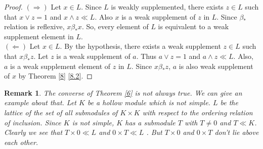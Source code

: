\documentclass[a4paper,12pt]{article}
\newtheorem{remark}[theorem]{Remark}
\numberwithin{equation}{section}
\begin{document}
\begin{proof}
  $ ( \Rightarrow ) $ 
  Let $ x \in L $. Since $ L $ is weakly supplemented, there exists $ z \in L $ such that 
  $ x \vee z = 1 $ and $ x \wedge z \ll L $. Also $ x $ is a weak supplement of $ z $ in $ L $. 
  Since $ \beta_* $ relation is reflexive, $ x \beta_* x $. So, every element of $ L $ is 
  equivalent to a weak supplement element in $ L $. \\
  $ ( \Leftarrow ) $
  Let $ x \in L $. By the hypothesis, there exists a weak supplement $ z \in L $ such that 
  $ x \beta_* z $. Let $ z $ is a weak supplement of $ a $. Thus $ a \vee z = 1 $ and $ a \wedge z \ll L $. 
  Also, $ a $ is a weak supplement element of $ z $ in $ L $. Since $ x \beta_* z $, 
  $ a $ is also weak supplement of $ x $ by Theorem \ref{8} \ref{8.2}.  
\end{proof}
\begin{remark}
  The converse of Theorem \ref{6} is not always true. We can give an example about that. Let $ K $ be a hollow module which is not simple. 
  $ L $ be the lattice of the set of all submodules of $ K \times K $ with respect to the ordering relation of inclusion. 
  Since $ K $ is not simple, $ K $ has a submodule $ T $ with $ T \neq 0 $ and $ T \ll K $. Clearly we see that $ T \times 0 \ll L $ and $ 0 \times T \ll L $ . 
  But $ T \times 0 $ and $ 0 \times T $ don't lie above each other.
\end{remark}


\cleardoublepage
\nocite{*}
\printbibliography[maxnames=99]
\end{document}
